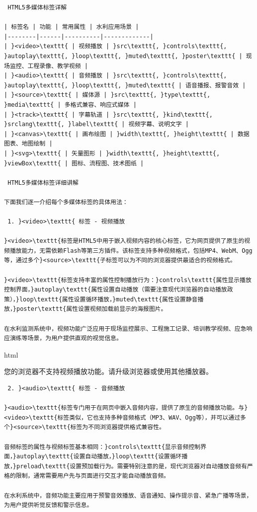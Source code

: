 \begin{lstlisting}
 HTML5多媒体标签详解

| 标签名 | 功能 | 常用属性 | 水利应用场景 |
|--------|------|----------|-------------|
| }<video>\texttt{ | 视频播放 | }src\texttt{, }controls\texttt{, }autoplay\texttt{, }loop\texttt{, }muted\texttt{, }poster\texttt{ | 现场监控、工程录像、教学视频 |
| }<audio>\texttt{ | 音频播放 | }src\texttt{, }controls\texttt{, }autoplay\texttt{, }loop\texttt{, }muted\texttt{ | 语音播报、报警音效 |
| }<source>\texttt{ | 媒体源 | }src\texttt{, }type\texttt{, }media\texttt{ | 多格式兼容、响应式媒体 |
| }<track>\texttt{ | 字幕轨道 | }src\texttt{, }kind\texttt{, }srclang\texttt{, }label\texttt{ | 视频字幕、说明文字 |
| }<canvas>\texttt{ | 画布绘图 | }width\texttt{, }height\texttt{ | 数据图表、地图绘制 |
| }<svg>\texttt{ | 矢量图形 | }width\texttt{, }height\texttt{, }viewBox\texttt{ | 图标、流程图、技术图纸 |

 HTML5多媒体标签详细讲解

下面我们逐一介绍每个多媒体标签的具体用法：

 1. }<video>\texttt{ 标签 - 视频播放

}<video>\texttt{标签是HTML5中用于嵌入视频内容的核心标签，它为网页提供了原生的视频播放能力，无需依赖Flash等第三方插件。该标签支持多种视频格式，包括MP4、WebM、Ogg等，通过多个}<source>\texttt{子标签可以为不同的浏览器提供最适合的视频格式。

}<video>\texttt{标签支持丰富的属性控制播放行为：}controls\texttt{属性显示播放控制界面，}autoplay\texttt{属性设置自动播放（需要注意现代浏览器的自动播放政策），}loop\texttt{属性设置循环播放，}muted\texttt{属性设置静音播放，}poster\texttt{属性设置视频加载前显示的海报图片。

在水利监测系统中，视频功能广泛应用于现场监控展示、工程施工记录、培训教学视频、应急响应演练等场景，为用户提供直观的视觉信息。
\end{lstlisting}

html

您的浏览器不支持视频播放功能。请升级浏览器或使用其他播放器。

\begin{lstlisting}
 2. }<audio>\texttt{ 标签 - 音频播放

}<audio>\texttt{标签专门用于在网页中嵌入音频内容，提供了原生的音频播放功能。与}<video>\texttt{标签类似，它也支持多种音频格式（MP3、WAV、Ogg等），并可以通过多个}<source>\texttt{标签为不同浏览器提供格式兼容性。

音频标签的属性与视频标签基本相同：}controls\texttt{显示音频控制界面，}autoplay\texttt{设置自动播放，}loop\texttt{设置循环播放，}preload\texttt{设置预加载行为。需要特别注意的是，现代浏览器对自动播放音频有严格的限制，通常需要用户先与页面进行交互才能自动播放音频。

在水利系统中，音频功能主要应用于预警音效播放、语音通知、操作提示音、紧急广播等场景，为用户提供听觉反馈和警示信息。
\end{lstlisting}


